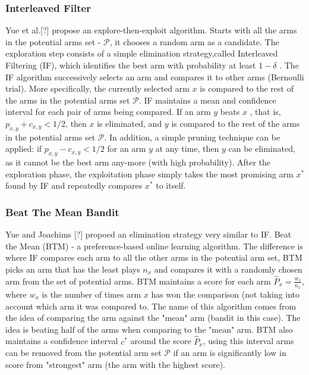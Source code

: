 \documentclass{llncs}
\begin{document}
\subsubsection{Interleaved Filter}
	Yue et al.[?] propose an explore-then-exploit algorithm.
	Starts with all the arms in the potential arms set - $\mathcal{P}$, it chooses a random arm as a candidate. 
	The exploration step consists of a simple elimination strategy,called Interleaved Filtering (IF), which identifies the best arm with probability at least $1-\delta $ . 
	The IF algorithm successively selects an arm and compares it to other arms (Bernoulli trial). 
	More specifically, the currently selected arm $x$ is compared to the rest of the arms in the potential arms set $\mathcal{P}$.
	IF maintains a mean and confidence interval for each pair of arms being compared. 
	If an arm $y$ beats $x$ , that is, $p_{x,y}+c_{x,y}<1/2$, then $x$ is eliminated, and $y$ is compared to the rest of the arms in the potential arms set $\mathcal{P}$.
	In addition, a simple pruning technique can be applied: if $p_{x,y}-c_{x,y}<1/2$ for an arm $y$ at any time, then $y$ can be eliminated, as it cannot be the best arm any-more (with high probability). 
	After the exploration phase, the exploitation phase simply takes the most promising arm $x^*$ found by IF and repeatedly compares $x^*$ to itself.	
	
	

\newpage

\subsubsection{Beat The Mean Bandit}	
	Yue and Joachims [?] propoed an elimination strategy very similar to IF. Beat the Mean (BTM) - a preference-based online learning algorithm. 
	The difference is where IF compares each arm to all the other arms in the potential arm set, BTM picks an arm that has the least plays $n_x$ and compares it with a randomly chosen arm from the set of potential arms.
	BTM maintains a score for each arm $\hat{P}_{x} = \frac{w_x}{n_x}$, where $w_x$ is the number of times arm $x$ has won the comparison (not taking into account which arm it was compared to.
	The name of this algorithm comes from the idea of comparing the arm against the "mean" arm (bandit in this case).
	The idea is beating half of the arms when comparing to the "mean" arm. 
	BTM also maintains a confidence interval $c^*$ around the score	$\hat{P}_{x}$, using this interval arms can be removed from the potential arm set $\mathcal{P}$ if an arm is significantly low in score from "strongest" arm (the arm with the highest score).
	
\end{document}
